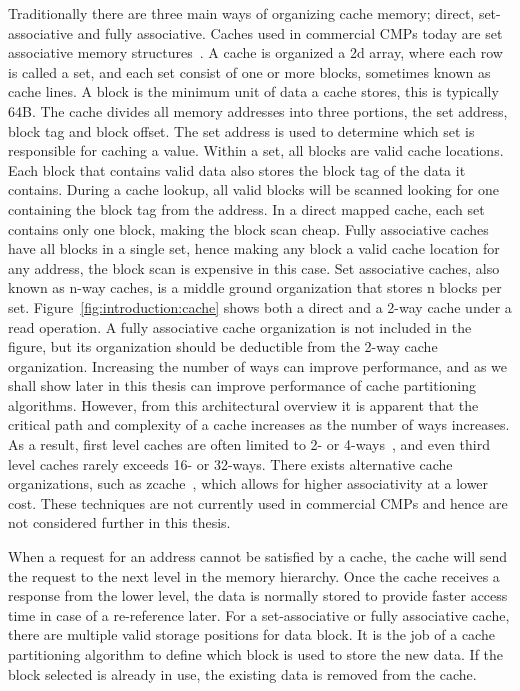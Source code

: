 Traditionally there are three main ways of organizing cache memory; direct, set-associative and fully associative.
Caches used in commercial CMPs today are set associative memory structures~\cite{Thomadakis2011, Jain2013}.
A cache is organized a 2d array, where each row is called a set, and each set consist of one or more blocks, sometimes known as cache lines.
A block is the minimum unit of data a cache stores, this is typically 64B.
The cache divides all memory addresses into three portions, the set address, block tag and block offset.
The set address is used to determine which set is responsible for caching a value.
Within a set, all blocks are valid cache locations.
Each block that contains valid data also stores the block tag of the data it contains.
During a cache lookup, all valid blocks will be scanned looking for one containing the block tag from the address.
In a direct mapped cache, each set contains only one block, making the block scan cheap.
Fully associative caches have all blocks in a single set, hence making any block a valid cache location for any address, the block scan is expensive in this case.
Set associative caches, also known as n-way caches, is a middle ground organization that stores n blocks per set.
Figure~\ref{fig:introduction:cache} shows both a direct and a 2-way cache under a read operation.
A fully associative cache organization is not included in the figure, but its organization should be deductible from the 2-way cache organization.
Increasing the number of ways can improve performance, and as we shall show later in this thesis can improve performance of cache partitioning algorithms.
However, from this architectural overview it is apparent that the critical path and complexity of a cache increases as the number of ways increases.
As a result, first level caches are often limited to 2- or 4-ways~\cite{Sachez2010}, and even third level caches rarely exceeds 16- or 32-ways.
There exists alternative cache organizations, such as zcache~\cite{Sanchez2010}, which allows for higher associativity at a lower cost.
These techniques are not currently used in commercial CMPs and hence are not considered further in this thesis.

When a request for an address cannot be satisfied by a cache, the cache will send the request to the next level in the memory hierarchy.
Once the cache receives a response from the lower level, the data is normally stored to provide faster access time in case of a re-reference later.
For a set-associative or fully associative cache, there are multiple valid storage positions for data block.
It is the job of a cache partitioning algorithm to define which block is used to store the new data.
If the block selected is already in use, the existing data is removed from the cache.

